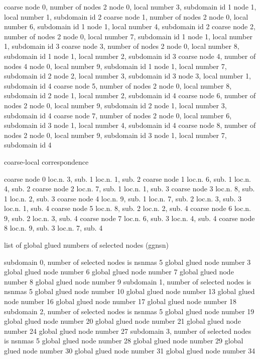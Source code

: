  coarse node      0, number of nodes  2   node 0, local number      3, subdomain id    1   node 1, local number      1, subdomain id    2
 coarse node      1, number of nodes  2   node 0, local number      6, subdomain id    1   node 1, local number      4, subdomain id    2
 coarse node      2, number of nodes  2   node 0, local number      7, subdomain id    1   node 1, local number      1, subdomain id    3
 coarse node      3, number of nodes  2   node 0, local number      8, subdomain id    1   node 1, local number      2, subdomain id    3
 coarse node      4, number of nodes  4   node 0, local number      9, subdomain id    1   node 1, local number      7, subdomain id    2   node 2, local number      3, subdomain id    3   node 3, local number      1, subdomain id    4
 coarse node      5, number of nodes  2   node 0, local number      8, subdomain id    2   node 1, local number      2, subdomain id    4
 coarse node      6, number of nodes  2   node 0, local number      9, subdomain id    2   node 1, local number      3, subdomain id    4
 coarse node      7, number of nodes  2   node 0, local number      6, subdomain id    3   node 1, local number      4, subdomain id    4
 coarse node      8, number of nodes  2   node 0, local number      9, subdomain id    3   node 1, local number      7, subdomain id    4


 coarse-local correspondence 

 coarse node      0    loc.n.      3, sub.    1    loc.n.      1, sub.    2
 coarse node      1    loc.n.      6, sub.    1    loc.n.      4, sub.    2
 coarse node      2    loc.n.      7, sub.    1    loc.n.      1, sub.    3
 coarse node      3    loc.n.      8, sub.    1    loc.n.      2, sub.    3
 coarse node      4    loc.n.      9, sub.    1    loc.n.      7, sub.    2    loc.n.      3, sub.    3    loc.n.      1, sub.    4
 coarse node      5    loc.n.      8, sub.    2    loc.n.      2, sub.    4
 coarse node      6    loc.n.      9, sub.    2    loc.n.      3, sub.    4
 coarse node      7    loc.n.      6, sub.    3    loc.n.      4, sub.    4
 coarse node      8    loc.n.      9, sub.    3    loc.n.      7, sub.    4


 list of global glued numbers of selected nodes (ggnsn)

 subdomain    0,  number of selected nodes is nsnmas 5
 global glued node number      3
 global glued node number      6
 global glued node number      7
 global glued node number      8
 global glued node number      9
 subdomain    1,  number of selected nodes is nsnmas 5
 global glued node number     10
 global glued node number     13
 global glued node number     16
 global glued node number     17
 global glued node number     18
 subdomain    2,  number of selected nodes is nsnmas 5
 global glued node number     19
 global glued node number     20
 global glued node number     21
 global glued node number     24
 global glued node number     27
 subdomain    3,  number of selected nodes is nsnmas 5
 global glued node number     28
 global glued node number     29
 global glued node number     30
 global glued node number     31
 global glued node number     34



